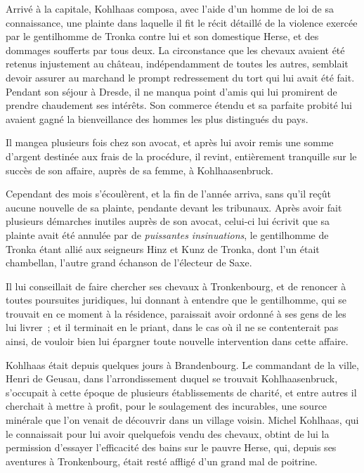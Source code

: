 \documentclass[french,twoside]{book} %
\newcommand\chaptercont{} %
\begin{document}
\chaptercont
\noindent Arrivé à la capitale, Kohlhaas composa, avec l’aide d’un homme de loi de sa connaissance, une plainte dans laquelle il fit le récit détaillé de la violence exercée par le gentilhomme de Tronka contre lui et son domestique Herse, et des dommages soufferts par tous deux. La circonstance que les chevaux avaient été retenus injustement au château, indépendamment de toutes les autres, semblait devoir assurer au marchand le prompt redressement du tort qui lui avait été fait. Pendant son séjour à Dresde, il ne manqua point d’amis qui lui promirent de prendre chaudement ses intérêts. Son commerce étendu et sa parfaite probité lui avaient gagné la bienveillance des hommes les plus distingués du pays.\par
Il mangea plusieurs fois chez son avocat, et après lui avoir remis une somme d’argent destinée aux frais de la procédure, il revint, entièrement tranquille sur le succès de son affaire, auprès de sa femme, à Kohlhaasenbruck.\par
Cependant des mois s’écoulèrent, et la fin de l’année arriva, sans qu’il reçût aucune nouvelle de sa plainte, pendante devant les tribunaux. Après avoir fait plusieurs démarches inutiles auprès de son avocat, celui-ci lui écrivit que sa plainte avait été annulée par de \emph{puissantes insinuations}, le gentilhomme de Tronka étant allié aux seigneurs Hinz et Kunz de Tronka, dont l’un était chambellan, l’autre grand échanson de l’électeur de Saxe.\par
Il lui conseillait de faire chercher ses chevaux à Tronkenbourg, et de renoncer à toutes poursuites juridiques, lui donnant à entendre que le gentilhomme, qui se trouvait en ce moment à la résidence, paraissait avoir ordonné à ses gens de les lui livrer ; et il terminait en le priant, dans le cas où il ne se contenterait pas ainsi, de vouloir bien lui épargner toute nouvelle intervention dans cette affaire.\par
Kohlhaas était depuis quelques jours à Brandenbourg. Le commandant de la ville, Henri de Geusau, dans l’arrondissement duquel se trouvait Kohlhaasenbruck, s’occupait à cette époque de plusieurs établissements de charité, et entre autres il cherchait à mettre à profit, pour le soulagement des incurables, une source minérale que l’on venait de découvrir dans un village voisin. Michel Kohlhaas, qui le connaissait pour lui avoir quelquefois vendu des chevaux, obtint de lui la permission d’essayer l’efficacité des bains sur le pauvre Herse, qui, depuis ses aventures à Tronkenbourg, était resté affligé d’un grand mal de poitrine.\par
\end{document}
